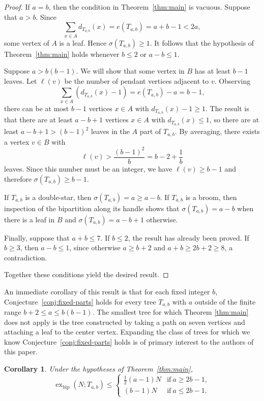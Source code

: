 \documentclass[10pt,a4paper]{amsart}
\newtheorem{corollary}[theorem]{Corollary}
\newcommand{\exbip}{\operatorname{ex}_{\mathrm{bip}}}
\begin{document}
\begin{proof}

If $a=b$, then the condition in Theorem~\ref{thm:main} is vacuous.
Suppose that $a>b$. Since
\[
    \sum_{ x\in A}d_{T_{a,b}}(x)=e(T_{a,b})=a+b-1<2a,
\]
some vertex of $A$ is a leaf. Hence $\sigma(T_{a,b})\geq 1$.
It follows that the hypothesis of Theorem~\ref{thm:main} holds
whenever $b\leq 2$ or $a-b\leq 1$. 

Suppose $a>b(b-1)$. We will show that some vertex in $B$ has at least $b-1$ leaves. Let $\ell(v)$ be the number of pendant vertices adjacent to $v$. Observing
\[
\sum_{x\in A}(d_{T_{a,b}}(x)-1)=e(T_{a,b})-a=b-1,
\]
there can be at most $b-1$ vertices $x\in A$ with $d_{T_{a,b}}(x)-1\geq 1$. The result is that there are at least $a-b+1$ vertices $x\in A$ with $d_{T_{a,b}}(x)\leq1$, so there are at least $a-b+1>(b-1)^2$ leaves in the $A$ part of $T_{a,b}$. By averaging, there exists a vertex $v\in B$ with
\[
\ell(v)>\frac{(b-1)^2}{b}=b-2+\frac{1}{b}
\]
leaves. Since this number must be an integer, we have $\ell(v)\geq b-1$ and therefore $\sigma(T_{a,b})\geq b-1$.

If $T_{a,b}$ is a double-star, then $\sigma(T_{a,b})=a\geq a-b$. If $T_{a,b}$ is a broom, then inspection of the bipartition along
its handle shows that $\sigma(T_{a,b})=a-b$ when there is a leaf in $B$ and $\sigma(T_{a,b})=a-b+1$ otherwise.

Finally, suppose that $a+b\leq 7$. If $b\leq 2$, the result has
already been proved. If $b\geq 3$, then $a-b\leq 1$, since otherwise
$a\geq b+2$ and $a+b\geq 2b+2\geq 8$, a contradiction.

Together these conditions yield the desired result.
\end{proof}

An immediate corollary of this result is that for each fixed integer $b$, Conjecture~\ref{conj:fixed-parts} holds for every tree $T_{a,b}$ with $a$ outside of the finite range $b+2\leq a\leq b(b-1)$. The smallest tree for which Theorem \ref{thm:main} does not apply is the tree constructed by taking a path on seven vertices and attaching a leaf to the center vertex. Expanding the class of trees for which we know Conjecture~\ref{conj:fixed-parts} holds is of primary interest to the authors of this paper.



\begin{corollary}
\label{cor:order-main}
Under the hypotheses of Theorem~\ref{thm:main},
\[
    \exbip(N;T_{a,b})\le\begin{cases}
        \frac12(a-1)N&\text{if}\ a\geq2b-1,\\
        (b-1)N&\text{if}\ a\leq2b-1.
    \end{cases}
\]
\end{corollary}
\end{document}
